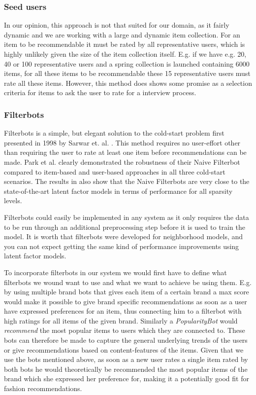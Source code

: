 \subsubsection{Seed users}

In our opinion, this approach is not that suited for our domain, as it fairly
dynamic and we are working with a large and dynamic item collection. For an item to be
recommendable it must be rated by all representative users, which is highly
unlikely given the size of the item collection itself. E.g. if we have e.g. 20, 40 or 100
representative users and a spring collection is launched containing 6000 items,
for all these items to be recommendable these 15 representative users must rate
all these items. However, this method does shows some promise as a selection criteria
for items to ask the user to rate for a interview process.

\subsubsection{Filterbots}

Filterbots is a simple, but elegant solution to the cold-start problem first
presented in 1998 by Sarwar et. al. \cite{Sarwar1998}. This method
requires no user-effort other than requiring the user to rate at least one
item before recommendations can be made.
Park et al. \cite{Park2006} clearly demonstrated the robustness of their Naive
Filterbot compared to item-based and user-based approaches in all three
cold-start scenarios. The results in \cite{Agarwal2009, Agarwal2010} also show
that the Naive Filterbots are very close to the state-of-the-art
latent factor models in terms of performance for all sparsity levels.

Filterbots could easily be implemented in any system as it only requires
the data to be run through an additional preprocessing step before it
is used to train the model. It is worth that filterbots were developed
for neighborhood models, and you can not expect getting the same kind
of performance improvements using latent factor models.

To incorporate filterbots in our system we would first have to define what filterbots
we wound want to use and what we want to achieve be using them. E.g. by using multiple
brand bots that gives each item of a certain brand a max score would make it possible to give brand specific
recommendations as soon as a user have expressed preferences for an item, thus connecting
him to a filterbot with high ratings for all items of the given brand. Similarly
a \emph{PopularityBot} would \emph{recommend} the most popular items to users which
they are connected to. These bots can therefore be made to capture the general underlying
trends of the users or give recommendations based on content-features of the items.
Given that we use the bots mentioned above, as soon as a new user rates a single item
rated by both bots he would theoretically be recommended the most popular items of
the brand which she expressed her preference for, making it a potentially good fit for fashion
recommendations.

